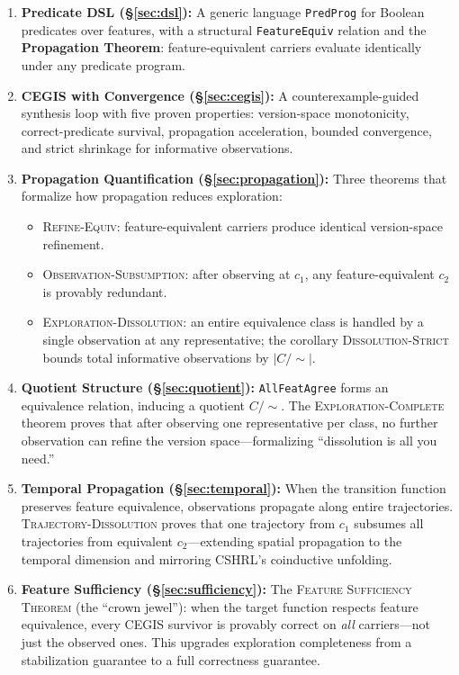 \documentclass[9pt,a4paper]{article}
\theoremstyle{plain}
\theoremstyle{definition}
\theoremstyle{remark}
\begin{document}
\begin{enumerate}
\item \textbf{Predicate DSL (\S\ref{sec:dsl}):} A generic language \texttt{PredProg} for Boolean predicates over features, with a structural \texttt{FeatureEquiv} relation and the \textbf{Propagation Theorem}: feature-equivalent carriers evaluate identically under any predicate program.

\item \textbf{CEGIS with Convergence (\S\ref{sec:cegis}):} A counterexample-guided synthesis loop with five proven properties: version-space monotonicity, correct-predicate survival, propagation acceleration, bounded convergence, and strict shrinkage for informative observations.

\item \textbf{Propagation Quantification (\S\ref{sec:propagation}):} Three theorems that formalize how propagation reduces exploration:
\begin{itemize}
\item \textsc{Refine-Equiv}: feature-equivalent carriers produce identical version-space refinement.
\item \textsc{Observation-Subsumption}: after observing at $c_1$, any feature-equivalent $c_2$ is provably redundant.
\item \textsc{Exploration-Dissolution}: an entire equivalence class is handled by a single observation at any representative; the corollary \textsc{Dissolution-Strict} bounds total informative observations by $|C/{\sim}|$.
\end{itemize}

\item \textbf{Quotient Structure (\S\ref{sec:quotient}):} \texttt{AllFeatAgree} forms an equivalence relation, inducing a quotient $C/{\sim}$.  The \textsc{Exploration-Complete} theorem proves that after observing one representative per class, no further observation can refine the version space---formalizing ``dissolution is all you need.''

\item \textbf{Temporal Propagation (\S\ref{sec:temporal}):} When the transition function preserves feature equivalence, observations propagate along entire trajectories.  \textsc{Trajectory-Dissolution} proves that one trajectory from $c_1$ subsumes all trajectories from equivalent $c_2$---extending spatial propagation to the temporal dimension and mirroring CSHRL's coinductive unfolding.

\item \textbf{Feature Sufficiency (\S\ref{sec:sufficiency}):} The \textsc{Feature Sufficiency Theorem} (the ``crown jewel''): when the target function respects feature equivalence, every CEGIS survivor is provably correct on \emph{all} carriers---not just the observed ones.  This upgrades exploration completeness from a stabilization guarantee to a full correctness guarantee.


\end{enumerate}
\end{document}
